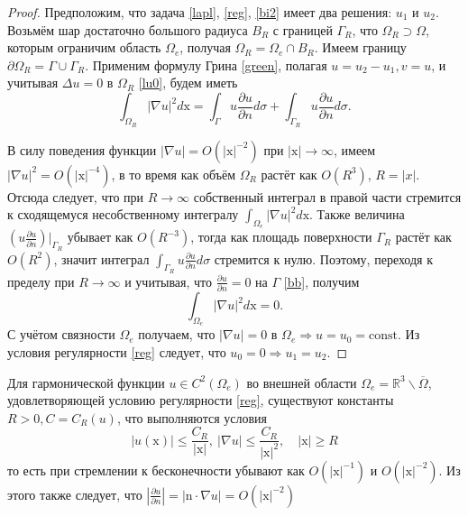     \begin{proof}
        Предположим, что задача \eqref{lapl}, \eqref{reg}, \eqref{bi2} имеет два решения: \(u_1\) и \(u_2\). Возьмём шар достаточно большого радиуса \(B_R\) с границей \(\Gamma_R\), что \(\Omega_R \supset \Omega\), которым ограничим область \(\Omega_e\), получая \(\Omega_R = \Omega_e \cap B_R\). Имеем границу \( \partial \Omega_R = \Gamma \cup \Gamma_R \). Применим формулу Грина \eqref{green}, полагая \( u = u_2 - u_1, v = u \), и учитывая \(\Delta u = 0\) в \( \Omega_R \) \eqref{lu0}, будем иметь
        \begin{equation}
            \int_{\Omega_R} | \nabla u |^2 d\mathrm{x} = \int_\Gamma u \frac{\partial u}{\partial n} d\sigma + \int_{\Gamma_R} u \frac{\partial u}{\partial n} d\sigma.
        \end{equation} 
        
        В силу поведения функции \( |\nabla u| = O(|\mathrm{x}|^{-2}) \) при \(|\mathrm{x}| \to \infty \), имеем \( |\nabla u|^2 = O( |\mathrm{x}|^{-4}) \), в то время как объём \(\Omega_R\) растёт как \(O (R^3) \), \(R = |x|\). Отсюда следует, что при \(R \to \infty \) собственный интеграл в правой части стремится к сходящемуся несобственному интегралу \( \int_{\Omega_e} | \nabla u |^2 d\mathrm{x} \). Также величина \( \left( u \frac{\partial u}{\partial n} \right) \big|_{\Gamma_R} \) убывает как \( O( R^{-3}) \), тогда как площадь поверхности \( \Gamma_R \) растёт как \( O(R^2) \), значит интеграл $\int_{\Gamma_R} u \frac{\partial u}{\partial n} d\sigma$ стремится к нулю. Поэтому, переходя к пределу при \(R \to \infty \) и учитывая, что \( \frac{\partial u}{\partial n} = 0 \) на \( \Gamma \) \eqref{bb}, получим
        \begin{equation}
            \int_{\Omega_e} | \nabla u |^2 d\mathrm{x} = 0.
        \end{equation}
        С учётом связности $\Omega_e$ получаем, что \( |\nabla u| = 0 \) в \(\Omega_e  \Rightarrow u = u_0 = \mathrm{const} \). Из условия регулярности \eqref{reg} следует, что \( u_0 = 0 \Rightarrow u_1 = u_2 \).        
    \end{proof}

    \begin{remark}
        Для гармонической функции $u \in C^2(\Omega_e)$ во внешней области $\Omega_e = \mathbb{R}^3 \backslash \overline{\Omega}$, удовлетворяющей условию регулярности \eqref{reg}, существуют константы $R > 0, C = C_R(u)$, что выполняются условия
        $$ |u(\mathrm{x})| \leq \frac{C_R}{|\mathrm{x}|}, ~ |\nabla u| \leq \frac{C_R}{|\mathrm{x}|^2}, \quad |\mathrm{x}| \geq R $$
        то есть при стремлении к бесконечности убывают как $O(|\mathrm{x}|^{-1})$ и $O(|\mathrm{x}|^{-2})$. Из этого также следует, что $\left| \frac{\partial u}{\partial n} \right| = |\mathrm{n} \cdot \nabla u| = O(|\mathrm{x}|^{-2})$
    \end{remark}

